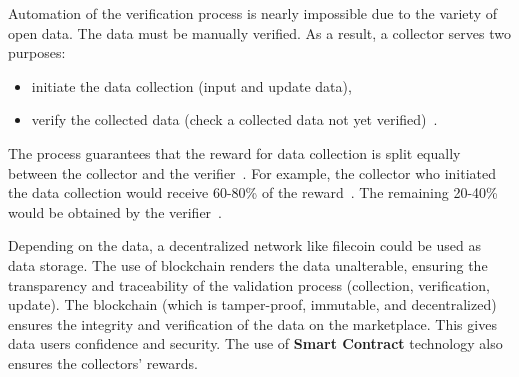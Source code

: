 Automation of the verification process is nearly impossible due to the variety of open data.
The data must be manually verified.
As a result, a collector serves two purposes:
\begin{itemize}
    \item initiate the data collection (input and update data),
    \item verify the collected data (check a collected data not yet verified)~\cite{dataeum}.
\end{itemize}

The process guarantees that the reward for data collection is split equally between the collector and the verifier~\cite{dataeum}.
For example, the collector who initiated the data collection would receive 60-80\% of the reward~\cite{dataeum}.
The remaining 20-40\% would be obtained by the verifier~\cite{dataeum}.

Depending on the data, a decentralized network like filecoin could be used as data storage.
The use of blockchain renders the data unalterable, ensuring the transparency and traceability of the validation process (collection, verification, update).
The blockchain (which is tamper-proof, immutable, and decentralized) ensures the integrity and verification of the data on the marketplace.
This gives data users confidence and security.
The use of \textbf{Smart Contract} technology also ensures the collectors' rewards.
